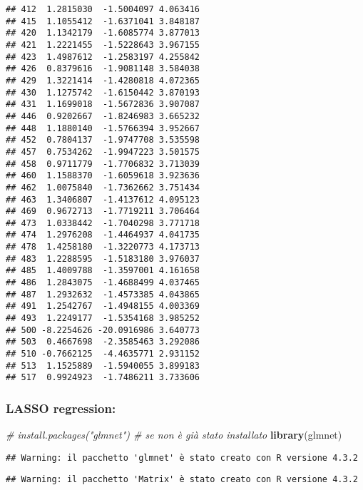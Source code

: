 \documentclass[
]{article}
\newenvironment{Shaded}{\begin{snugshade}}{\end{snugshade}}
\newcommand{\CommentTok}[1]{\textcolor[rgb]{0.56,0.35,0.01}{\textit{#1}}}
\newcommand{\FunctionTok}[1]{\textcolor[rgb]{0.13,0.29,0.53}{\textbf{#1}}}
\newcommand{\NormalTok}[1]{#1}
\begin{document}
\begin{verbatim}
## 412  1.2815030  -1.5004097 4.063416
## 415  1.1055412  -1.6371041 3.848187
## 420  1.1342179  -1.6085774 3.877013
## 421  1.2221455  -1.5228643 3.967155
## 423  1.4987612  -1.2583197 4.255842
## 426  0.8379616  -1.9081148 3.584038
## 429  1.3221414  -1.4280818 4.072365
## 430  1.1275742  -1.6150442 3.870193
## 431  1.1699018  -1.5672836 3.907087
## 446  0.9202667  -1.8246983 3.665232
## 448  1.1880140  -1.5766394 3.952667
## 452  0.7804137  -1.9747708 3.535598
## 457  0.7534262  -1.9947223 3.501575
## 458  0.9711779  -1.7706832 3.713039
## 460  1.1588370  -1.6059618 3.923636
## 462  1.0075840  -1.7362662 3.751434
## 463  1.3406807  -1.4137612 4.095123
## 469  0.9672713  -1.7719211 3.706464
## 473  1.0338442  -1.7040298 3.771718
## 474  1.2976208  -1.4464937 4.041735
## 478  1.4258180  -1.3220773 4.173713
## 483  1.2288595  -1.5183180 3.976037
## 485  1.4009788  -1.3597001 4.161658
## 486  1.2843075  -1.4688499 4.037465
## 487  1.2932632  -1.4573385 4.043865
## 491  1.2542767  -1.4948155 4.003369
## 493  1.2249177  -1.5354168 3.985252
## 500 -8.2254626 -20.0916986 3.640773
## 503  0.4667698  -2.3585463 3.292086
## 510 -0.7662125  -4.4635771 2.931152
## 513  1.1525889  -1.5940055 3.899183
## 517  0.9924923  -1.7486211 3.733606
\end{verbatim}

\hypertarget{lasso-regression}{%
\subsubsection{LASSO regression:}\label{lasso-regression}}

\begin{Shaded}
\begin{Highlighting}[]
\CommentTok{\# install.packages("glmnet") \# se non è già stato installato}
\FunctionTok{library}\NormalTok{(glmnet) }
\end{Highlighting}
\end{Shaded}

\begin{verbatim}
## Warning: il pacchetto 'glmnet' è stato creato con R versione 4.3.2
\end{verbatim}

\begin{verbatim}
## Warning: il pacchetto 'Matrix' è stato creato con R versione 4.3.2
\end{verbatim}
\end{document}
